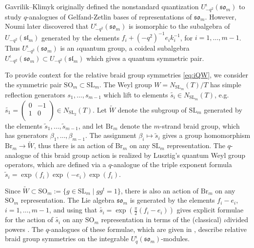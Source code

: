 \documentclass[10pt]{amsart}
\numberwithin{equation}{section}
\theoremstyle{definition}
\let\tilde=\widetilde
\newcommand{\slm}{\mathfrak{sl}_{m}}
\newcommand{\som}[1][m]{\mathfrak{so}_{#1}}
\newcommand{\Br}{\mathrm{Br}}
\newcommand{\iqUsom}[1][m]{{U}^{\iota}_{-q^2}(\som[#1])}
\begin{document}
Gavrilik--Klimyk \cite{GK-Usom} originally defined the
nonstandard quantization $\iqUsom$ to study $q$-analogues of Gelfand-Zetlin bases 
of representations of $\mathfrak{so}_m$. 
However, Noumi \cite{Noumi} later discovered that $\iqUsom$ is isomorphic to the subalgebra of $U_{-q^2}(\slm)$ 
generated by the elements $f_i+ (-q^2)^{-1}e_ik_i^{-1}$, for $i=1, \dots, m-1$. 
Thus $\iqUsom$ is an $\iota$quantum group, a coideal subalgebra $\iqUsom \subset U_{-q^2}(\slm)$
which gives a quantum symmetric pair.

To provide context for the relative braid group symmetries \eqref{eq:iQW}, 
we consider the symmetric pair $\mathrm{SO}_m\subset \mathrm{SL}_m$. 
The Weyl group $W= N_{\mathrm{SL}_m}(T)/T$ has simple reflection generators $s_1, \ldots , s_{m-1}$ 
which lift to elements $\tilde{s_i}\in N_{\mathrm{SL}_m}(T)$, e.g.~$\tilde{s_1}=
\begin{pmatrix}
0 & -1 \\
1 & 0 \\
\end{pmatrix}\in N_{\mathrm{SL}_2}(T)$. 
Let $\tilde{W}$ denote the subgroup of $\mathrm{SL}_m$ 
generated by the elements $\tilde{s}_1, \dots, \tilde{s}_{m-1}$,
and let $\Br_m$ denote the $m$-strand braid group, 
which has generators $\beta_1, \dots, \beta_{m-1}$. 
The assignment $\beta_i\mapsto \tilde{s}_i$ gives a group homomorphism $\Br_m\rightarrow \tilde{W}$, 
thus there is an action of $\Br_m$ on any $\mathrm{SL}_m$ representation.
The $q$-analogue of this braid group action is realized by Lusztig's quantum Weyl group operators, 
which are defined via a $q$-analogue of the triple exponent formula $\tilde{s}_i=\exp(f_i)\exp(-e_i)\exp(f_i)$.

Since $\tilde{W}\subset \mathrm{SO}_m:=\{g\in \mathrm{SL}_m \mid gg^t=1\}$, 
there is also an action of $\Br_m$ on any $\mathrm{SO}_m$ representation.
The Lie algebra $\som$ is generated by the elements $f_i-e_i$, $i=1, \dots, m-1$, 
and using that $\tilde{s_i}=\exp(\frac{\pi}{2}(f_i-e_i))$ 
gives explicit formulae for the action of $\tilde{s_i}$ on any $\mathrm{SO}_m$ representation 
in terms of the (classical) $\iota$divided powers \cite[Definition 3.8]{MR4983792}. 
The $q$-analogues of these formulae, which are given in \cite[Section 3.1]{wang2026relativebraidgroupsymmetries}, 
describe relative braid group symmetries on the integrable $U_q^{\iota}(\som)$-modules.
\end{document}
